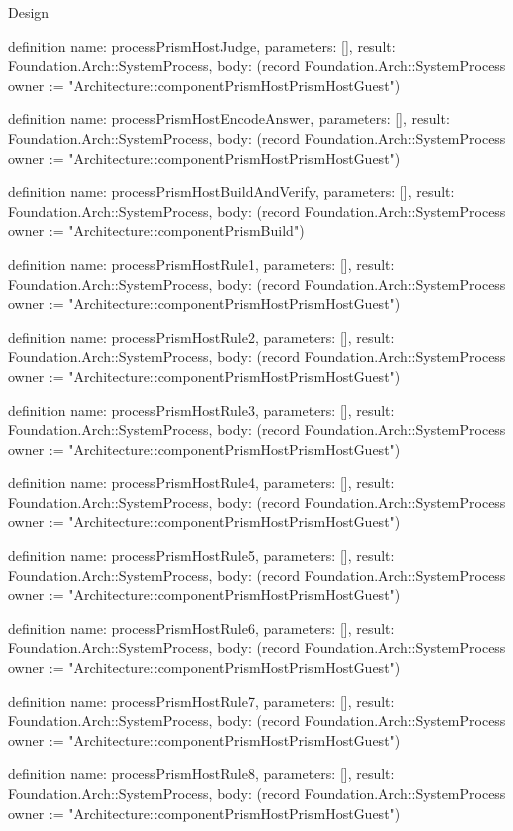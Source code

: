 \begin{lexlean}{Design}
\begin{semanticmodule}
definition{
  name: processPrismHostJudge,
  parameters: [],
  result: Foundation.Arch::SystemProcess,
  body: (record Foundation.Arch::SystemProcess {owner := "Architecture::componentPrismHostPrismHostGuest"})
}

definition{
  name: processPrismHostEncodeAnswer,
  parameters: [],
  result: Foundation.Arch::SystemProcess,
  body: (record Foundation.Arch::SystemProcess {owner := "Architecture::componentPrismHostPrismHostGuest"})
}

definition{
  name: processPrismHostBuildAndVerify,
  parameters: [],
  result: Foundation.Arch::SystemProcess,
  body: (record Foundation.Arch::SystemProcess {owner := "Architecture::componentPrismBuild"})
}

definition{
  name: processPrismHostRule1,
  parameters: [],
  result: Foundation.Arch::SystemProcess,
  body: (record Foundation.Arch::SystemProcess {owner := "Architecture::componentPrismHostPrismHostGuest"})
}

definition{
  name: processPrismHostRule2,
  parameters: [],
  result: Foundation.Arch::SystemProcess,
  body: (record Foundation.Arch::SystemProcess {owner := "Architecture::componentPrismHostPrismHostGuest"})
}

definition{
  name: processPrismHostRule3,
  parameters: [],
  result: Foundation.Arch::SystemProcess,
  body: (record Foundation.Arch::SystemProcess {owner := "Architecture::componentPrismHostPrismHostGuest"})
}

definition{
  name: processPrismHostRule4,
  parameters: [],
  result: Foundation.Arch::SystemProcess,
  body: (record Foundation.Arch::SystemProcess {owner := "Architecture::componentPrismHostPrismHostGuest"})
}

definition{
  name: processPrismHostRule5,
  parameters: [],
  result: Foundation.Arch::SystemProcess,
  body: (record Foundation.Arch::SystemProcess {owner := "Architecture::componentPrismHostPrismHostGuest"})
}

definition{
  name: processPrismHostRule6,
  parameters: [],
  result: Foundation.Arch::SystemProcess,
  body: (record Foundation.Arch::SystemProcess {owner := "Architecture::componentPrismHostPrismHostGuest"})
}

definition{
  name: processPrismHostRule7,
  parameters: [],
  result: Foundation.Arch::SystemProcess,
  body: (record Foundation.Arch::SystemProcess {owner := "Architecture::componentPrismHostPrismHostGuest"})
}

definition{
  name: processPrismHostRule8,
  parameters: [],
  result: Foundation.Arch::SystemProcess,
  body: (record Foundation.Arch::SystemProcess {owner := "Architecture::componentPrismHostPrismHostGuest"})
}


\end{semanticmodule}
\end{lexlean}
